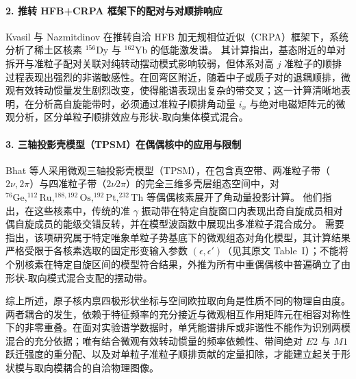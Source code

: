 \paragraph{2. 推转 HFB+CRPA 框架下的配对与对顺排响应}
Kvasil 与 Nazmitdinov 在推转自洽 HFB 加无规相位近似（CRPA）框架下，系统分析了稀土区核素 $^{156}\mathrm{Dy}$ 与 $^{162}\mathrm{Yb}$ 的低能激发谱。\cite{kvasil-2006-dy156-yb162-crpa-wobbling} 其计算指出，基态附近的单对拆开与准粒子配对关联对纯转动摆动模式影响较弱，但体系对高 $j$ 准粒子的顺排过程表现出强烈的非谐敏感性。在回弯区附近，随着中子或质子对的退耦顺排，微观有效转动惯量发生剧烈改变，使得能谱表现出复杂的带交叉；这一计算清晰地表明，在分析高自旋能带时，必须通过准粒子顺排角动量 $i_x$ 与绝对电磁矩阵元的微观分析，区分单粒子顺排效应与形状-取向集体模式混合。\cite{kvasil-2006-dy156-yb162-crpa-wobbling}

\paragraph{3. 三轴投影壳模型（TPSM）在偶偶核中的应用与限制}
Bhat 等人采用微观三轴投影壳模型（TPSM），在包含真空带、两准粒子带（$2\nu, 2\pi$）与四准粒子带（$2\nu 2\pi$）的完全三维多壳层组态空间中，对 $^{76}\mathrm{Ge}, ^{112}\mathrm{Ru}, ^{188,192}\mathrm{Os}, ^{192}\mathrm{Pt}, ^{232}\mathrm{Th}$ 等偶偶核素展开了角动量投影计算。\cite{doctoral-r1-g37-bhat-2025-microscopic-wobbling-even-even} 他们指出，在这些核素中，传统的准 $\gamma$ 振动带在特定自旋窗口内表现出奇自旋成员相对偶自旋成员的能级交错反转，并在模型波函数中展现出多准粒子混合成分。\cite{doctoral-r1-g37-bhat-2025-microscopic-wobbling-even-even} 需要指出，该项研究属于特定唯象单粒子势基底下的微观组态对角化模型，其计算结果严格受限于各核素选取的固定形变输入参数 $(\epsilon, \epsilon')$（见其原文 Table~I）；不能将个别核素在特定自旋区间的模型符合结果，外推为所有中重偶偶核中普遍确立了由形状-取向模式混合支配的摆动带。

综上所述，原子核内禀四极形状坐标与空间欧拉取向角是性质不同的物理自由度。两者耦合的发生，依赖于特征频率的充分接近与微观相互作用矩阵元在相容对称性下的非零重叠。在面对实验谱学数据时，单凭能谱排斥或非谐性不能作为识别两模混合的充分依据；唯有结合微观有效转动惯量的频率依赖性、带间绝对 $E2$ 与 $M1$ 跃迁强度的重分配、以及对单粒子准粒子顺排贡献的定量扣除，才能建立起关于形状模与取向模耦合的自洽物理图像。
